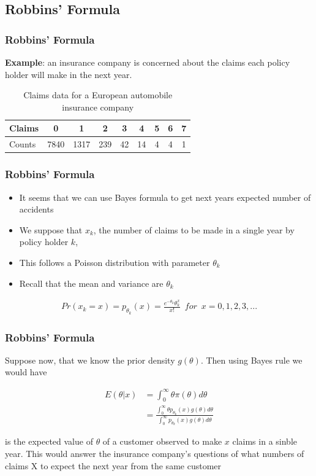 \documentclass[
  shownotes,
  xcolor={svgnames},
  hyperref={colorlinks,citecolor=DarkBlue,linkcolor=DarkRed,urlcolor=DarkBlue}
  ]{beamer}
\begin{document}
\subsection{Robbins' Formula}
\begin{frame}[fragile]
\frametitle{Robbins' Formula}
{\bf Example}: an insurance company is concerned about the claims each policy holder will make in the next year.
\begin{table}[H]
\caption{Claims data for a European automobile insurance company}
\begin{tabular}{lcccccccc}
Claims & 0    & 1    & 2   & 3  & 4  & 5 & 6 & 7 \\
\hline
Counts & 7840 & 1317 & 239 & 42 & 14 & 4 & 4 & 1 \\
\end{tabular}
\end{table}

\end{frame}
\begin{frame}[fragile]
\frametitle{Robbins' Formula}

\begin{itemize}
\item It seems that we can use Bayes formula to get next years expected number of accidents
\item We suppose that $x_k$, the number of claims to be made in a single year by policy holder $k$, 
\item This follows a Poisson distribution with parameter $\theta_k$
\item Recall that the mean and variance are $\theta_k$
\end{itemize}

\begin{align}
Pr(x_k=x) = p_{\theta_k}(x)= \frac{e^{-\theta_k} \theta_k^x}{x!} \,\,\, for \,\,\, x=0,1,2,3,...
\end{align}


\end{frame}
\begin{frame}[fragile]
\frametitle{Robbins' Formula}

Suppose now, that we know the prior density $g(\theta)$. Then using Bayes rule we would have

\begin{align}
E(\theta|x)&= \int_0^{\infty} \theta \pi(\theta)d\theta \\
 &=\frac{\int_0^{\infty} \theta p_{\theta_k}(x) g(\theta) d\theta }{\int_0^{\infty} p_{\theta_k}(x) g(\theta) d\theta}
\end{align}

is the expected value of $\theta$ of a customer observed to make $x$ claims in a sinble year. This would answer the insurance company's questions of what numbers of claims X to expect the next year from the same customer

\end{frame}
\end{document}
